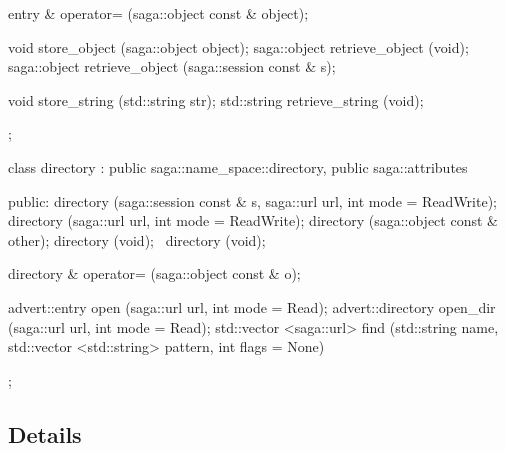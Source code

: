 \begin{mycode}[label=Prototypes: saga::advert]
{{{          entry & operator= (saga::object const & object);
  
          void         store_object    (saga::object object);
          saga::object retrieve_object (void);
          saga::object retrieve_object (saga::session const & s);
  
          void         store_string    (std::string str);
          std::string  retrieve_string (void);
      };
  
      class directory 
          : public saga::name_space::directory, 
            public saga::attributes
      {
        public:
          directory (saga::session const & s, 
                     saga::url             url, 
                     int                   mode = ReadWrite);
          directory (saga::url url, 
                     int                   mode = ReadWrite);
          directory (saga::object const & other);
          directory (void);
         ~directory (void);
  
          directory & operator= (saga::object const & o);                                                      
  
          advert::entry     open     (saga::url   url, 
                                      int         mode = Read);
          advert::directory open_dir (saga::url   url, 
                                      int         mode = Read);
          std::vector <saga::url> 
                            find     (std::string name, 
                                      std::vector <std::string> pattern, 
                                      int        flags = None)
      };
    }
  }

\end{mycode}

\subsection{Details}


